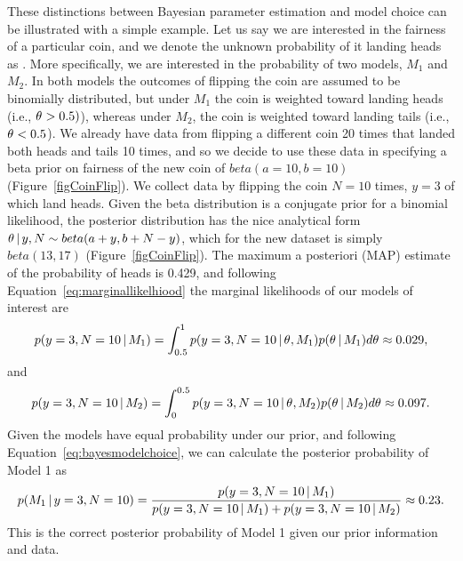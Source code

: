 \documentclass[letterpaper,12pt]{article}
\begin{document}
\begin{linenumbers}
These distinctions between Bayesian parameter estimation and model choice can
be illustrated with a simple example.
Let us say we are interested in the fairness of a particular coin, and we
denote the unknown probability of it landing heads as \myTheta{}.
More specifically, we are interested in the probability of two models, $M_1$
and $M_2$.
In both models the outcomes of flipping the coin are assumed to be binomially
distributed, but under $M_1$ the coin is weighted toward landing heads (i.e.,
$\theta_{} > 0.5)$), whereas under $M_2$, the coin is weighted toward landing
tails (i.e., $\theta_{} < 0.5$).
We already have data from flipping a different coin 20 times that landed both
heads and tails 10 times, and so we decide to use these data in specifying a
beta prior on fairness of the new coin of $beta(a=10, b=10)$
(Figure~\ref{figCoinFlip}).
We collect data by flipping the coin $N=10$ times, $y=3$ of which land heads.
Given the beta distribution is a conjugate prior for a binomial likelihood, the
posterior distribution has the nice analytical form $\theta \,|\, y,N \sim
beta(a + y, b + N - y)$, which for the new dataset is simply $beta(13, 17)$
(Figure~\ref{figCoinFlip}).
The maximum a posteriori (MAP) estimate of the probability of heads is 0.429,
and following Equation~\ref{eq:marginallikelhiood} the marginal likelihoods of
our models of interest are
\begin{equation}
    p(y=3, N=10 \,|\, M_1) = \int_{0.5}^{1} p(y=3, N=10 \,|\,
    \theta_{}, M_1)p(\theta_{} \,|\, M_1) d\theta_{} \approx 0.029,
\end{equation}
and
\begin{equation}
    p(y=3, N=10 \,|\, M_2) = \int_{0}^{0.5} p(y=3, N=10 \,|\,
    \theta_{}, M_2)p(\theta_{} \,|\, M_2) d\theta_{} \approx 0.097.
\end{equation}
Given the models have equal probability under our prior, and following
Equation~\ref{eq:bayesmodelchoice}, we can calculate the posterior
probability of Model 1 as
\begin{equation}
    p(M_1 \,|\, y=3, N=10) = \frac{p(y=3, N=10 \,|\, M_1)}{p(y=3, N=10 \,|\,
    M_1) + p(y=3, N=10 \,|\, M_2)} \approx 0.23.
\end{equation}
This is the correct posterior probability of Model 1 given our prior information
and data.


\end{linenumbers}
\end{document}
